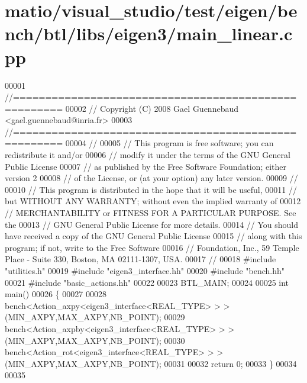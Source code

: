 \hypertarget{matio_2visual__studio_2test_2eigen_2bench_2btl_2libs_2eigen3_2main__linear_8cpp_source}{}\section{matio/visual\+\_\+studio/test/eigen/bench/btl/libs/eigen3/main\+\_\+linear.cpp}
\label{matio_2visual__studio_2test_2eigen_2bench_2btl_2libs_2eigen3_2main__linear_8cpp_source}

\begin{DoxyCode}
00001 \textcolor{comment}{//=====================================================}
00002 \textcolor{comment}{// Copyright (C) 2008 Gael Guennebaud <gael.guennebaud@inria.fr>}
00003 \textcolor{comment}{//=====================================================}
00004 \textcolor{comment}{//}
00005 \textcolor{comment}{// This program is free software; you can redistribute it and/or}
00006 \textcolor{comment}{// modify it under the terms of the GNU General Public License}
00007 \textcolor{comment}{// as published by the Free Software Foundation; either version 2}
00008 \textcolor{comment}{// of the License, or (at your option) any later version.}
00009 \textcolor{comment}{//}
00010 \textcolor{comment}{// This program is distributed in the hope that it will be useful,}
00011 \textcolor{comment}{// but WITHOUT ANY WARRANTY; without even the implied warranty of}
00012 \textcolor{comment}{// MERCHANTABILITY or FITNESS FOR A PARTICULAR PURPOSE.  See the}
00013 \textcolor{comment}{// GNU General Public License for more details.}
00014 \textcolor{comment}{// You should have received a copy of the GNU General Public License}
00015 \textcolor{comment}{// along with this program; if not, write to the Free Software}
00016 \textcolor{comment}{// Foundation, Inc., 59 Temple Place - Suite 330, Boston, MA  02111-1307, USA.}
00017 \textcolor{comment}{//}
00018 \textcolor{preprocessor}{#include "utilities.h"}
00019 \textcolor{preprocessor}{#include "eigen3\_interface.hh"}
00020 \textcolor{preprocessor}{#include "bench.hh"}
00021 \textcolor{preprocessor}{#include "basic\_actions.hh"}
00022 
00023 BTL\_MAIN;
00024 
00025 \textcolor{keywordtype}{int} main()
00026 \{
00027 
00028   bench<Action\_axpy<eigen3\_interface<REAL\_TYPE> > >(MIN\_AXPY,MAX\_AXPY,NB\_POINT);
00029   bench<Action\_axpby<eigen3\_interface<REAL\_TYPE> > >(MIN\_AXPY,MAX\_AXPY,NB\_POINT);
00030   bench<Action\_rot<eigen3\_interface<REAL\_TYPE> > >(MIN\_AXPY,MAX\_AXPY,NB\_POINT);
00031   
00032   \textcolor{keywordflow}{return} 0;
00033 \}
00034 
00035 
\end{DoxyCode}
